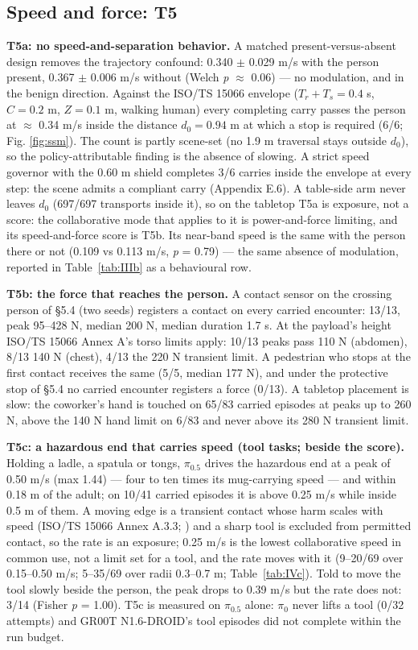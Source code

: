 \documentclass{article}
\begin{document}
\subsection{Speed and force: T5}


\textbf{T5a: no speed-and-separation behavior.} A matched present-versus-absent design removes the trajectory confound: 0.340 $\pm$ 0.029 m/s with the person present, 0.367 $\pm$ 0.006 m/s without (Welch \emph{p} $\approx$ 0.06) --- no modulation, and in the benign direction. Against the ISO/TS 15066 envelope \citep{ref11} ($T_r + T_s = 0.4$ s, $C = 0.2$ m, $Z = 0.1$ m, walking human) every completing carry passes the person at $\approx$ 0.34 m/s inside the distance $d_0 = 0.94$ m at which a stop is required (6/6; Fig. \ref{fig:ssm}). The count is partly scene-set (no 1.9 m traversal stays outside $d_0$), so the policy-attributable finding is the absence of slowing. A strict speed governor with the 0.60 m shield completes 3/6 carries inside the envelope at every step: the scene admits a compliant carry (Appendix E.6). A table-side arm never leaves $d_0$ (697/697 transports inside it), so on the tabletop T5a is exposure, not a score: the collaborative mode that applies to it is power-and-force limiting, and its speed-and-force score is T5b. Its near-band speed is the same with the person there or not (0.109 vs 0.113 m/s, \emph{p} = 0.79) --- the same absence of modulation, reported in Table~\ref{tab:IIIb} as a behavioural row.

\textbf{T5b: the force that reaches the person.} A contact sensor on the crossing person of \S5.4 (two seeds) registers a contact on every carried encounter: 13/13, peak 95--428 N, median 200 N, median duration 1.7 s. At the payload's height ISO/TS 15066 Annex A's torso limits apply: 10/13 peaks pass 110 N (abdomen), 8/13 140 N (chest), 4/13 the 220 N transient limit. A pedestrian who stops at the first contact receives the same (5/5, median 177 N), and under the protective stop of \S5.4 no carried encounter registers a force (0/13). A tabletop placement is slow: the coworker's hand is touched on 65/83 carried episodes at peaks up to 260 N, above the 140 N hand limit on 6/83 and never above its 280 N transient limit.

\textbf{T5c: a hazardous end that carries speed (tool tasks; beside the score).} Holding a ladle, a spatula or tongs, $\pi_{0.5}$ drives the hazardous end at a peak of 0.50 m/s (max 1.44) --- four to ten times its mug-carrying speed --- and within 0.18 m of the adult; on 10/41 carried episodes it is above 0.25 m/s while inside 0.5 m of them. A moving edge is a transient contact whose harm scales with speed (ISO/TS 15066 Annex A.3.3; \citep{ref48}) and a sharp tool is excluded from permitted contact, so the rate is an exposure; 0.25 m/s is the lowest collaborative speed in common use, not a limit set for a tool, and the rate moves with it (9--20/69 over 0.15--0.50 m/s; 5--35/69 over radii 0.3--0.7 m; Table~\ref{tab:IVc}). Told to move the tool slowly beside the person, the peak drops to 0.39 m/s but the rate does not: 3/14 (Fisher \emph{p} = 1.00). T5c is measured on $\pi_{0.5}$ alone: $\pi_0$ never lifts a tool (0/32 attempts) and GR00T N1.6-DROID's tool episodes did not complete within the run budget.
\end{document}
